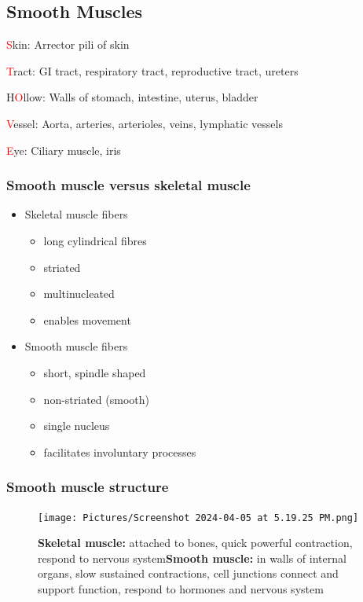 \documentclass[11pt,fleqn]{book} %
\begin{document}
\subsection{Smooth Muscles}
\begin{descriptions}
    \item[\textcolor{red}{S}kin: ]Arrector pili of skin 
    \item[\textcolor{red}{T}ract: ]GI tract, respiratory tract, reproductive tract, ureters
    \item[H\textcolor{red}{O}llow: ]Walls of stomach, intestine, uterus, bladder
    \item[\textcolor{red}{V}essel: ]Aorta, arteries, arterioles, veins, lymphatic vessels
    \item[\textcolor{red}{E}ye: ] Ciliary muscle, iris
\end{descriptions}
\subsubsection{Smooth muscle versus skeletal muscle}
\begin{itemize}
    \item Skeletal muscle fibers
    \begin{itemize}
        \item long cylindrical fibres
        \item striated
        \item multinucleated
        \item enables movement
    \end{itemize}
    \item Smooth muscle fibers
    \begin{itemize}
        \item short, spindle shaped
        \item non-striated (smooth)
        \item single nucleus
        \item facilitates involuntary processes
    \end{itemize}
\end{itemize}

\subsubsection{Smooth muscle structure}
\begin{figure}[h!]
\begin{center}
    \texttt{[image: Pictures/Screenshot 2024-04-05 at 5.19.25 PM.png]}
\end{center}
    \caption{\textbf{Skeletal muscle:} attached to bones, quick powerful contraction, respond to nervous system\textbf{Smooth muscle:} in walls of internal organs, slow sustained contractions, cell junctions connect and support function, respond to hormones and nervous system}
\end{figure}
\end{document}
